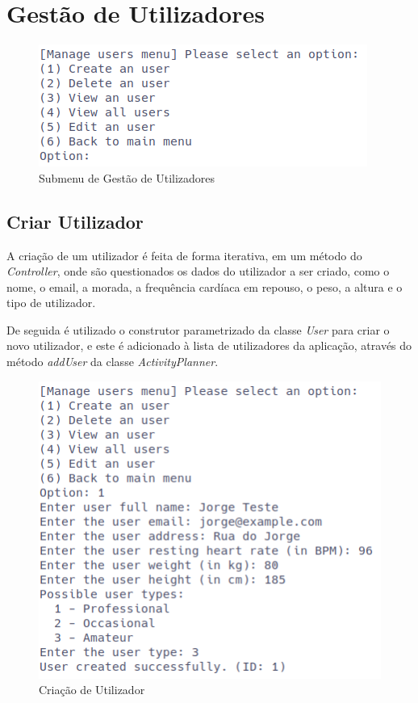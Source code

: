 \documentclass[a4paper,12pt]{scrreprt}
\begin{document}
\section{Gestão de Utilizadores}
    \label{sec:gestao-utilizadores}
    \begin{figure}[!ht]
        \centering
        \includegraphics[width=\textwidth]{images/manageUsersSubMenu.png}
        \caption{Submenu de Gestão de Utilizadores}
        \label{fig:submenu-users}
    \end{figure}

    \clearpage
    \subsection{Criar Utilizador}
    A criação de um utilizador é feita de forma iterativa, em um método do \textit{Controller},
    onde são questionados os dados do utilizador a ser criado,
    como o nome, o email, a morada, a frequência cardíaca em repouso, o peso, a altura e o tipo de utilizador.

    De seguida é utilizado o construtor parametrizado da classe \textit{User} para criar o novo utilizador,
    e este é adicionado à lista de utilizadores da aplicação,
    através do método \textit{addUser} da classe \textit{ActivityPlanner}.

    \begin{figure}[!ht]
        \centering
        \includegraphics[width=\textwidth]{images/createUser.png}
        \caption{Criação de Utilizador}
        \label{fig:create-user}
    \end{figure}
\end{document}
